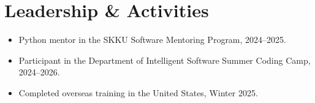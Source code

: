 \documentclass[letterpaper,10pt]{article}
\begin{document}
\section*{Leadership \& Activities}

\begin{itemize}
    \item Python mentor in the SKKU Software Mentoring Program, 2024--2025.
    \item Participant in the Department of Intelligent Software Summer Coding Camp, 2024--2026.
    \item Completed overseas training in the United States, Winter 2025.
\end{itemize}
\end{document}
